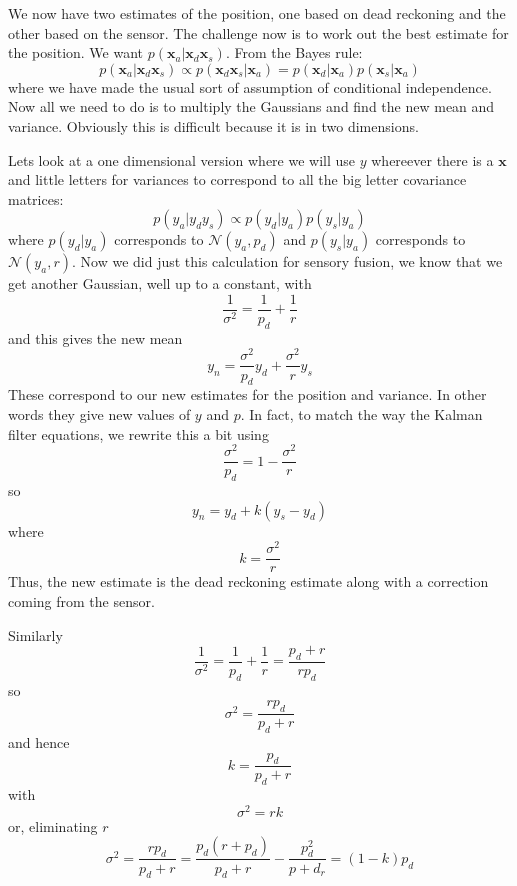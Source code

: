 \documentclass[12pt]{article}
\begin{document}
We now have two estimates of the position, one based on dead reckoning
and the other based on the sensor. The challenge now is to work out
the best estimate for the position. We want
$p(\mathbf{x}_a|\mathbf{x}_d\mathbf{x}_s)$. From the Bayes rule:
\begin{equation}
p(\mathbf{x}_a|\mathbf{x}_d\mathbf{x}_s)\propto p(\mathbf{x}_d\mathbf{x}_s|\mathbf{x}_a)=p(\mathbf{x}_d|\mathbf{x}_a)p(\mathbf{x}_s|\mathbf{x}_a)
\end{equation}
where we have made the usual sort of assumption of conditional
independence. Now all we need to do is to multiply the Gaussians and
find the new mean and variance. Obviously this is difficult because it
is in two dimensions. 

Lets look at a one dimensional version where we will use $y$ whereever
there is a $\mathbf{x}$ and little letters for variances to correspond
to all the big letter covariance matrices:
\begin{equation}
p(y_a|y_dy_s)\propto p(y_d|y_a)p(y_s|y_a)
\end{equation}
where $p(y_d|y_a)$ corresponds to $\mathcal{N}(y_a,p_d)$ and
$p(y_s|y_a)$ corresponds to $\mathcal{N}(y_a,r)$. Now we did just this calculation for sensory fusion, we know that we get another Gaussian, well up to a constant, with 
\begin{equation}
\frac{1}{\sigma^2}=\frac{1}{p_d}+\frac{1}{r}
\end{equation}
and this gives the new mean
\begin{equation}
y_n=\frac{\sigma^2}{p_d}y_d+\frac{\sigma^2}{r}y_s
\end{equation}
These correspond to our new estimates for the position and
variance. In other words they give new values of $y$ and $p$. In fact, to match the way the Kalman filter equations, we rewrite this a bit using
\begin{equation}
\frac{\sigma^2}{p_d}=1-\frac{\sigma^2}{r}
\end{equation}
so
\begin{equation}
y_n=y_d+k(y_s-y_d)
\end{equation}
where
\begin{equation}
k=\frac{\sigma^2}{r}
\end{equation}
Thus, the new estimate is the dead reckoning estimate along with a correction coming from the sensor. 

Similarly
\begin{equation}
\frac{1}{\sigma^2}=\frac{1}{p_d}+\frac{1}{r}=\frac{p_d+r}{rp_d}
\end{equation}
so 
\begin{equation}
\sigma^2=\frac{rp_d}{p_d+r}
\end{equation}
and hence
\begin{equation}
k=\frac{p_d}{p_d+r}
\end{equation}
with
\begin{equation}
\sigma^2=rk
\end{equation}
or, eliminating $r$
\begin{equation}
\sigma^2=\frac{rp_d}{p_d+r}=\frac{p_d(r+p_d)}{p_d+r}-\frac{p_d^2}{p+d_r}=(1-k)p_d
\end{equation}
\end{document}
